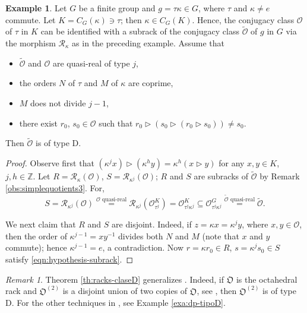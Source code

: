 \documentclass[11pt]{amsart} \textheight 22cm
\newcommand{\oct}{\mathfrak O}
\renewcommand{\^}[1]{\mbox{$^{\left( #1 \right)}$}}
\renewcommand{\_}[1]{\mbox{$_{\left( #1 \right)}$}}
\newcommand{\trid}{\triangleright}
\newcommand{\R}{{\mathcal R}}
\newcommand{\Z}{{\mathbb Z}}
\newcommand{\oc}{{\mathcal O}}
\theoremstyle{plain}
\theoremstyle{definition}
\newtheorem{exa}[lema]{Example}
\theoremstyle{remark}
\newtheorem{obs}[lema]{Remark}
\def\pf{\begin{proof}}
\def\epf{\end{proof}}
\theoremstyle{remark}
\begin{document}
\begin{exa}\label{exa:jordan}
Let $G$ be a finite group and $g = \tau\kappa\in G$, where $\tau$ and $\kappa\neq e$ commute.
Let $K =  C_G(\kappa) \ni \tau$; then
$\kappa\in C_G(K)$. Hence, the conjugacy class
$\oc$ of $\tau$ in $K$ can be identified with a subrack of the conjugacy
class $\widetilde{\oc}$ of $g$ in $G$ via the
morphism $\R_\kappa$ as in the preceding example.
Assume that
\begin{itemize}
\item $\widetilde{\oc}$ and $\oc$ are quasi-real of type $j$,
\item the orders $N$ of $\tau$ and $M$ of $\kappa$ are coprime,
\item $M$ does not divide $j-1$,
\item there exist $r_0$, $s_0\in \oc$ such that $r_0\trid(s_0\trid(r_0\trid s_0)) \neq s_0$.
\end{itemize}
Then $\widetilde{\oc}$ is of type D.
\end{exa}

\pf Observe first that $(\kappa^j x)\trid (\kappa^h y) = \kappa^h (x\trid y)$
for any $x,y\in K$, $j,h \in \Z$.
Let $R = \R_{\kappa}(\oc)$,
$S = \R_{\kappa^{j}}(\oc)$;  $R$ and $S$ are subracks of $\widetilde\oc$ by Remark \ref{obs:simplequotients3}.
For,
$$
S = \R_{\kappa^{j}}(\oc) \overset{\text{$\oc$ quasi-real}}= \R_{\kappa^{j}}(\oc_{\tau^j}^K) = \oc_{\tau^j\kappa^{j}}^K \subseteq \oc_{\tau^j\kappa^{j}}^G \overset{\text{$\widetilde{\oc}$ quasi-real}}= \widetilde\oc.
$$

We next claim that $R$ and $S$ are disjoint. Indeed, if
$z = \kappa x = \kappa^{j} y$, where $x,y\in \oc$, then the order
of $\kappa^{j-1}  = xy^{-1}$ divides both $N$ and $M$ (note that $x$ and $y$ commute);
hence $\kappa^{j-1} = e$, a contradiction.
Now $r = \kappa r_0\in R$,
$s = \kappa^{j} s_0\in S$ satisfy \eqref{eqn:hypothesis-subrack}.
\epf



\begin{obs}
Theorem \ref{th:racks-claseD} generalizes \cite[Cor. 4.12]{AF3}.
Indeed, if $\oct$ is the octahedral rack and $\oct^{(2)}$ is a
disjoint union of two copies of $\oct$, see \cite{AF3}, then
$\oct^{(2)}$ is of type D. For the other techniques in \cite{AF3},
see Example \ref{exa:dp-tipoD}.
\end{obs}




\bigbreak
\end{document}
